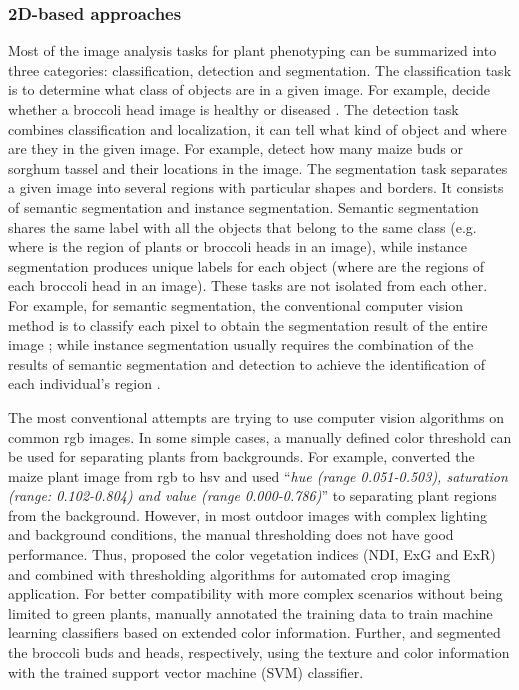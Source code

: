 \subsubsection{2D-based approaches}

Most of the image analysis tasks for plant phenotyping can be summarized into three categories: classification, detection and segmentation. The classification task is to determine what class of objects are in a given image. For example, decide whether a broccoli head image is healthy or diseased \citep{garcia_towards_2021}. The detection task combines classification and localization, it can tell what kind of object and where are they in the given image. For example, detect how many maize buds \citep{liu_estimating_2022} or sorghum tassel \citep{ghosal_weakly_2019} and their locations in the image. The segmentation task separates a given image into several regions with particular shapes and borders. It consists of semantic segmentation and instance segmentation. Semantic segmentation shares the same label with all the objects that belong to the same class (e.g. where is the region of plants or broccoli heads in an image), while instance segmentation produces unique labels for each object (where are the regions of each broccoli head in an image). These tasks are not isolated from each other. For example, for semantic segmentation, the conventional computer vision method is to classify each pixel to obtain the segmentation result of the entire image \citep{guo_easypcc_2017}; while instance segmentation usually requires the combination of the results of semantic segmentation and detection to achieve the identification of each individual's region \citep[Fig.~2]{luling_using_2021}.


The most conventional attempts are trying to use computer vision algorithms on common \gls{rgb} images. In some simple cases, a manually defined color threshold can be used for separating plants from backgrounds. For example, \citet{choudhury_holistic_2018} converted the maize plant image from \gls{rgb} to \gls{hsv} and used ``\textit{hue (range 0.051-0.503), saturation (range: 0.102-0.804) and value (range 0.000-0.786)}'' to separating plant regions from the background. However, in most outdoor images with complex lighting and background conditions, the manual thresholding does not have good performance. Thus, \citet{meyer_verification_2008} proposed the color vegetation indices (NDI, ExG and ExR) and combined with \citet{otsu_threshold_1979} thresholding algorithms for automated crop imaging application. For better compatibility with more complex scenarios without being limited to green plants, \citet{guo_easypcc_2017} manually annotated the training data to train machine learning classifiers based on extended color information. Further, \citet{zou_broccoli_2019} and \citet{blok_machine_2016} segmented the broccoli buds and heads, respectively, using the texture and color information with the trained support vector machine (SVM) classifier.

